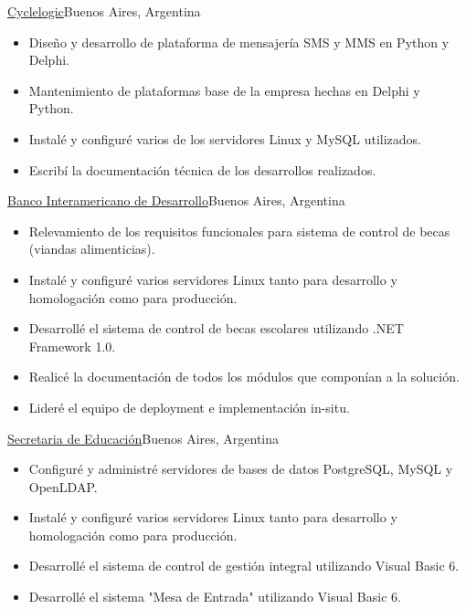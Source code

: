 \documentclass[a4paper,11pt]{moderncv}
\newcommand\weblink[2] {{\color{href} \href{#1}{#2}}}
\begin{document}
%
{\weblink{http://www.cyclelogic.com}{Cyclelogic}}{Buenos Aires, Argentina}{}{%
\begin{itemize}
  \item Dise\~no y desarrollo de plataforma de mensajer\'ia SMS y MMS en Python y Delphi.
  \item Mantenimiento de plataformas base de la empresa hechas en Delphi y Python.
  \item Instal\'e y configur\'e varios de los servidores Linux y MySQL utilizados.
  \item Escrib\'i la documentaci\'on t\'ecnica de los desarrollos realizados.
\end{itemize}
}
%
{\weblink{http://www.iadb.org}{Banco Interamericano de Desarrollo}}{Buenos Aires, Argentina}{}{%
\begin{itemize}
  \item Relevamiento de los requisitos funcionales para sistema de control de becas (viandas alimenticias).
  \item Instal\'e y configur\'e varios servidores Linux tanto para desarrollo y homologaci\'on como para producci\'on.
  \item Desarroll\'e el sistema de control de becas escolares utilizando .NET Framework 1.0.
  \item Realic\'e la documentaci\'on de todos los m\'odulos que compon\'ian a la soluci\'on.
  \item Lider\'e el equipo de deployment e implementaci\'on in-situ.
\end{itemize}
}
%
{\weblink{http://www.buenosaires.gov.ar/areas/educacion}{Secretaria de Educaci\'on}}{Buenos Aires, Argentina}{}{%
\begin{itemize}
  \item Configur\'e y administr\'e servidores de bases de datos PostgreSQL, MySQL y OpenLDAP.
  \item Instal\'e y configur\'e varios servidores Linux tanto para desarrollo y homologaci\'on como para producci\'on.
  \item Desarroll\'e el sistema de control de gesti\'on integral utilizando Visual Basic 6.
  \item Desarroll\'e el sistema "Mesa de Entrada" utilizando Visual Basic 6.
\end{itemize}
}
\end{document}
